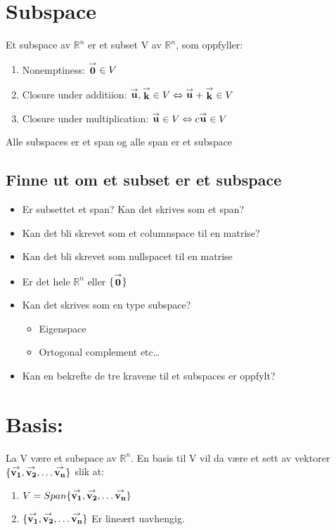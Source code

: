 \documentclass[12pt,a4paper,twocolumn,twoside]{article}
\def\real{\mathbb{R}}
\def\vector#1{\bold{\stackrel{\rightarrow}{#1}}}
\begin{document}
%
%
\section*{Subspace}
Et subspace av $\real^n$ er et subset V av $\real^n$, som oppfyller:
\begin{enumerate}[topsep=0pt,itemsep=0pt, partopsep=0pt]
    \item Nonemptiness: $\vector{0}\in V$
    \item Closure under additiion: $\vector{u},\vector{k}\in V \Leftrightarrow \vector{u}+\vector{k}\in V$
    \item Closure under multiplication: $\vector{u}\in V \Leftrightarrow c\vector{u}\in V$
\end{enumerate}
Alle subspaces er et span og alle span er et subspace
\subsection*{Finne ut om et subset er et subspace}
\begin{itemize}[topsep=0pt,itemsep=0pt, partopsep=0pt]
    \item Er subsettet et span? Kan det skrives som et span?
    \item Kan det bli skrevet som et columnspace til en matrise?
    \item Kan det bli skrevet som nullspacet til en matrise
    \item Er det hele $\real^n$ eller $\{\vector{0}\}$
    \item Kan det skrives som en type subspace?
    \begin{itemize}[topsep=0pt,itemsep=0pt, partopsep=0pt]
        \item Eigenspace
        \item Ortogonal complement etc\dots
    \end{itemize}
    \item Kan en bekrefte de tre kravene til et subspaces er oppfylt?
\end{itemize}
\section*{Basis:}
La V være et subspace av $\real^n$. En basis til V vil da være et sett av
vektorer $\{\vector{v_1},\vector{v_2},\dots\vector{v_n}\}$ slik at:
\begin{enumerate}[topsep=0pt,itemsep=0pt, partopsep=0pt]
    \item $V = Span\{\vector{v_1},\vector{v_2},\dots\vector{v_n}\}$
    \item $\{\vector{v_1},\vector{v_2},\dots\vector{v_n}\}$ Er lineært uavhengig.
\end{enumerate}
\end{document}
